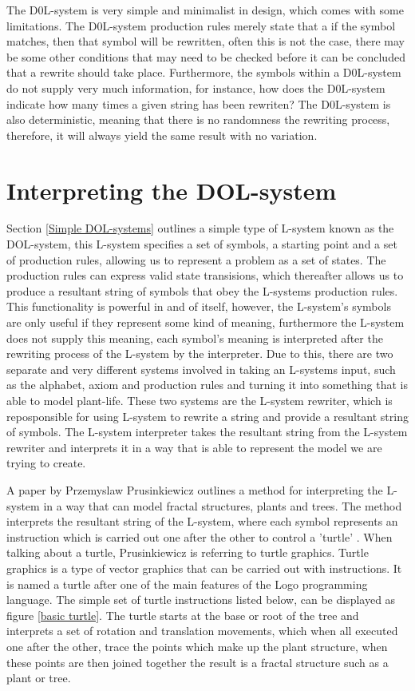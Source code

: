 The D0L-system is very simple and minimalist in design, which comes with some limitations. The D0L-system production rules merely state that a if the symbol matches, then that symbol will be rewritten, often this is not the case, there may be some other conditions that may need to be checked before it can be concluded that a rewrite should take place. Furthermore, the symbols within a D0L-system do not supply very much information, for instance, how does the D0L-system indicate how many times a given string has been rewriten? The D0L-system is also deterministic, meaning that there is no randomness the rewriting process, therefore, it will always yield the same result with no variation.

\section{Interpreting the DOL-system} \label{Interpreting DOL-system}

Section \ref{Simple DOL-systems} outlines a simple type of L-system known as the DOL-system, this L-system specifies a set of symbols, a starting point and a set of production rules, allowing us to represent a problem as a set of states. The production rules can express valid state transisions, which thereafter allows us to produce a resultant string of symbols that obey the L-systems production rules. This functionality is powerful in and of itself, however, the L-system's symbols are only useful if they represent some kind of meaning, furthermore the L-system does not supply this meaning, each symbol's meaning is interpreted after the rewriting process of the L-system by the interpreter. Due to this, there are two separate and very different systems involved in taking an L-systems input, such as the alphabet, axiom and production rules and turning it into something that is able to model plant-life. These two systems are the L-system rewriter, which is reposponsible for using L-system to rewrite a string and provide a resultant string of symbols. The L-system interpreter takes the resultant string from the L-system rewriter and interprets it in a way that is able to represent the model we are trying to create. 

A paper by Przemyslaw Prusinkiewicz outlines a method for interpreting the L-system in a way that can model fractal structures, plants and trees. The method interprets the resultant string of the L-system, where each symbol represents an instruction which is carried out one after the other to control a 'turtle' \cite{prusinkiewicz1986graphical}. When talking about a turtle, Prusinkiewicz is referring to turtle graphics. Turtle graphics is a type of vector graphics that can be carried out with instructions. It is named a turtle after one of the main features of the Logo programming language. The simple set of turtle instructions listed below, can be displayed as figure \ref{basic turtle}. The turtle starts at the base or root of the tree and interprets a set of rotation and translation movements, which when all executed one after the other, trace the points which make up the plant structure, when these points are then joined together the result is a fractal structure such as a plant or tree.


